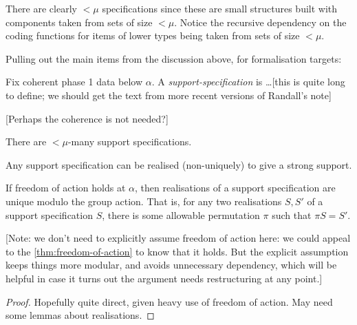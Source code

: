 There are clearly $<\mu$ specifications since these are small structures built with components taken from sets of size $<\mu$.  Notice the recursive dependency on the coding functions for items of lower types being taken from sets of size $<\mu$.

Pulling out the main items from the discussion above, for formalisation targets:

\begin{definition}
  \label{def:support-spec}
  Fix coherent phase 1 data below $\alpha$.  A \emph{support-specification} is \ldots [this is quite long to define; we should get the text from more recent versions of Randall’s note]

  [Perhaps the coherence is not needed?]
\end{definition}

\begin{lemma}
  \label{lem:count-support-specs}
  There are $<\mu$-many support specifications.
\end{lemma}

\begin{definition}
  \label{def:support-spec-realisation}
  Any support specification can be realised (non-uniquely) to give a strong support.
\end{definition}

\begin{lemma}
  \label{lem:support-spec-realisation-unique}
  If freedom of action holds at $\alpha$, then realisations of a support specification are unique modulo the group action.  That is, for any two realisations $S, S'$ of a support specification $S$, there is some allowable permutation $\pi$ such that $\pi S = S'$.

  [Note: we don’t need to explicitly assume freedom of action here: we could appeal to the \cref{thm:freedom-of-action} to know that it holds.  But the explicit assumption keeps things more modular, and avoids unnecessary dependency, which will be helpful in case it turns out the argument needs restructuring at any point.]
\end{lemma}

\begin{proof}
  Hopefully quite direct, given heavy use of freedom of action.  May need some lemmas about realisations.
\end{proof}

